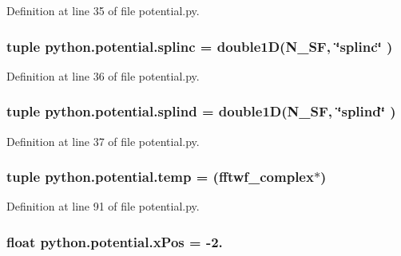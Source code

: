 Definition at line 35 of file potential.\-py.

\hypertarget{namespacepython_1_1potential_a7bc450096386b25a35acb14b766083d0}{
\subsubsection[{splinc}]{\setlength{\rightskip}{0pt plus 5cm}tuple python.\-potential.\-splinc = double1\-D({\bf N\-\_\-\-S\-F}, \char`\"{}splinc\char`\"{} )}}\label{namespacepython_1_1potential_a7bc450096386b25a35acb14b766083d0}


Definition at line 36 of file potential.\-py.

\hypertarget{namespacepython_1_1potential_a9476e6e98237c222b8416108bae144ae}{
\subsubsection[{splind}]{\setlength{\rightskip}{0pt plus 5cm}tuple python.\-potential.\-splind = double1\-D({\bf N\-\_\-\-S\-F}, \char`\"{}splind\char`\"{} )}}\label{namespacepython_1_1potential_a9476e6e98237c222b8416108bae144ae}


Definition at line 37 of file potential.\-py.

\hypertarget{namespacepython_1_1potential_a4d5761985f6a550371a25acd44f03763}{
\subsubsection[{temp}]{\setlength{\rightskip}{0pt plus 5cm}tuple python.\-potential.\-temp = (fftwf\-\_\-complex$\ast$)}}\label{namespacepython_1_1potential_a4d5761985f6a550371a25acd44f03763}


Definition at line 91 of file potential.\-py.

\hypertarget{namespacepython_1_1potential_a21b7cc018bddc98e423f99bcb862034e}{
\subsubsection[{x\-Pos}]{\setlength{\rightskip}{0pt plus 5cm}float python.\-potential.\-x\-Pos = -\/2.}}\label{namespacepython_1_1potential_a21b7cc018bddc98e423f99bcb862034e}


